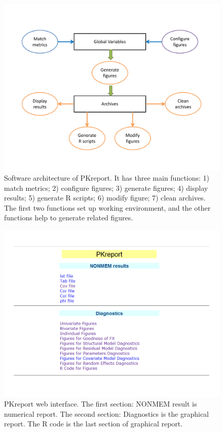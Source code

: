\documentclass[a4paper]{article}
\begin{document}
\begin{figure}[h!tb] \centering
\includegraphics[scale=0.5]{c2_s1_1.pdf}
\caption{Software architecture of PKreport. It has three main functions: 1) match metrics; 2) configure figures; 3) generate figures; 4) display results; 5) generate R scripts; 6) modify figure; 7) clean archives. The first two functions set up working environment, and the other functions help to generate related figures.}
\label{c2_s1_1}
\end{figure}

\begin{figure}[h!tb] \centering
\includegraphics[scale=0.5]{c2_s2_2web.pdf}
\caption{PKreport web interface. The first section: NONMEM result is numerical report. 
The second section: Diagnostics is the graphical report. The R code is
the last section of graphical report.}
\label{c2_s2_2web}
\end{figure}
\end{document}
